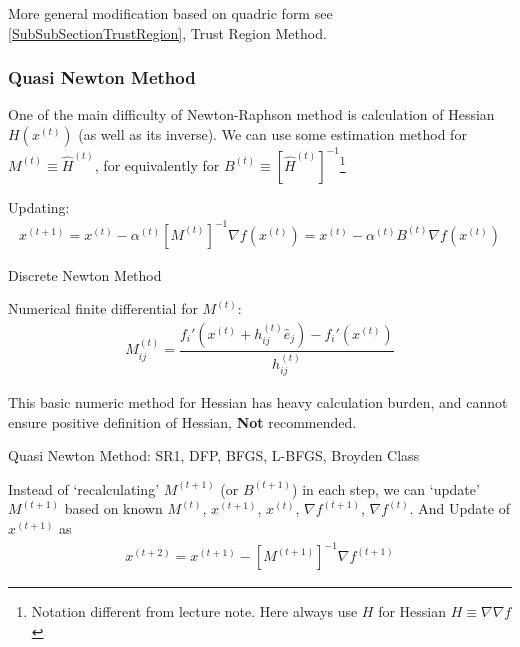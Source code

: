     More general modification based on quadric form see \autoref{SubSubSectionTrustRegion}, Trust Region Method.
    


\subsubsection{Quasi Newton Method}
\hypertarget{QuasiNewtonMethod}{}
    One of the main difficulty of Newton-Raphson method is calculation of Hessian $ H\left(x^{(t)}\right) $ (as well as its inverse). We can use some estimation method for $ M^{(t)}\equiv \hat{H}^{(t)} $, for equivalently for $ B^{(t)}\equiv\left[\hat{H}^{(t)}\right]^{-1} $\footnote{Notation different from lecture note. Here always use $ H $ for Hessian $ H\equiv\nabla\nabla f $}

    Updating:
    \begin{align}
        x^{(t+1)}=x^{(t)}-\alpha ^{(t)}\left[ M^{(t)} \right]^{-1}\nabla f\left(x^{(t)}\right)=x^{(t)}-\alpha ^{(t)}B^{(t)}\nabla f\left(x^{(t)}\right) 
    \end{align}
    
    

\begin{point}
    Discrete Newton Method
\end{point}

    Numerical finite differential for $ M^{(t)} $:
    \begin{align}
        M^{(t)} _{ij}=\dfrac{f_i'\left(x^{(t)}+h_{ij}^{(t)}\hat{e}_j\right)-f_i'\left(x^{(t)}\right)}{h_{ij}^{(t)}}
    \end{align}
    
    This basic numeric method for Hessian has heavy calculation burden, and cannot ensure positive definition of Hessian,     
    \textbf{Not} recommended. 

\begin{point}
    Quasi Newton Method: SR1, DFP, BFGS, L-BFGS, Broyden Class
\end{point}

    Instead of `recalculating' $ M^{(t+1)} $ (or $ B^{(t+1)} $) in each step, we can `update' $ M^{(t+1)} $ based on known $ M^{(t)} $, $ x^{(t+1)} $, $ x^{(t)} $, $ \nabla f^{(t+1)} $, $ \nabla f^{(t)} $. And Update of $ x^{(t+1)} $ as
    \begin{align}
        x^{(t+2)}=x^{(t+1)}-\left[M^{(t+1)}\right]^{-1}\nabla f^{(t+1)} 
    \end{align}
 
